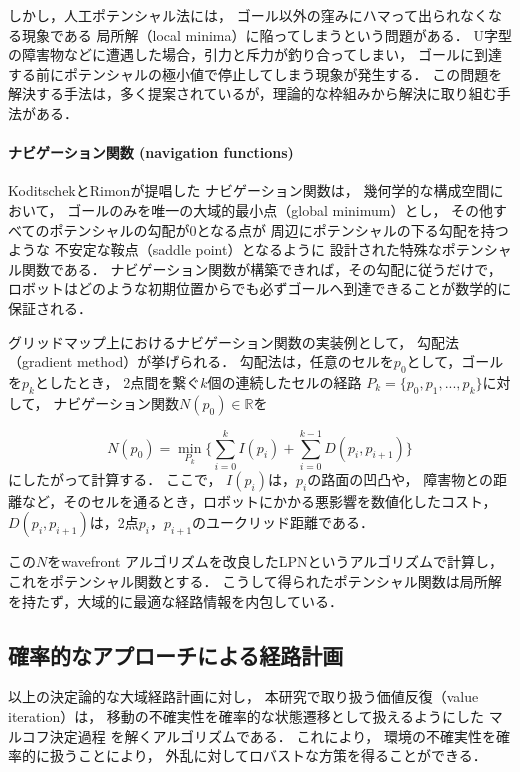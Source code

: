 しかし，人工ポテンシャル法には，
ゴール以外の窪みにハマって出られなくなる現象である
局所解（local minima）に陥ってしまうという問題がある．
U字型の障害物などに遭遇した場合，引力と斥力が釣り合ってしまい，
ゴールに到達する前にポテンシャルの極小値で停止してしまう現象が発生する．
この問題を解決する手法は，多く提案されているが，理論的な枠組みから解決に取り組む手法がある．

\paragraph{ナビゲーション関数 (navigation functions)}
KoditschekとRimon\cite{Koditschek1990}が提唱した
ナビゲーション関数は，
幾何学的な構成空間において，
ゴールのみを唯一の大域的最小点（global minimum）とし，
その他すべてのポテンシャルの勾配が$0$となる点が
周辺にポテンシャルの下る勾配を持つような
不安定な鞍点（saddle point）となるように
設計された特殊なポテンシャル関数である．
ナビゲーション関数が構築できれば，その勾配に従うだけで，
ロボットはどのような初期位置からでも必ずゴールへ到達できることが数学的に保証される．

グリッドマップ上におけるナビゲーション関数の実装例として，
勾配法（gradient method）\cite{Konolige2000}が挙げられる．
勾配法は，任意のセルを$p_0$として，ゴールを$p_k$としたとき，
2点間を繋ぐ$k$個の連続したセルの経路
$P_k=\{p_0, p_1, ..., p_k\}$に対して，
ナビゲーション関数$N(p_0) \in \mathbb{R}$を

\begin{equation}
  N(p_0) = \min_{P_k}{\{ \sum_{i=0}^{k}{I(p_i)} + \sum_{i=0}^{k-1}{D(p_i,p_{i+1})}\}}
    \label{eq:kinolige_fomula}
\end{equation}
にしたがって計算する．
ここで，
$I(p_i)$は，$p_i$の路面の凹凸や，%
障害物との距離など，そのセルを通るとき，ロボットにかかる悪影響を数値化したコスト，
$D(p_i,p_{i+1})$は，2点$p_i$，$p_{i+1}$のユークリッド距離である．

この$N$をwavefront アルゴリズム\cite{Arkin1990}を改良したLPNというアルゴリズムで計算し，
これをポテンシャル関数とする．
こうして得られたポテンシャル関数は局所解を持たず，大域的に最適な経路情報を内包している．


\subsection{確率的なアプローチによる経路計画}
以上の決定論的な大域経路計画に対し，
本研究で取り扱う価値反復（value iteration）は，
移動の不確実性を確率的な状態遷移として扱えるようにした
マルコフ決定過程
を解くアルゴリズムである．
これにより，
環境の不確実性を確率的に扱うことにより，
外乱に対してロバストな方策を得ることができる．

